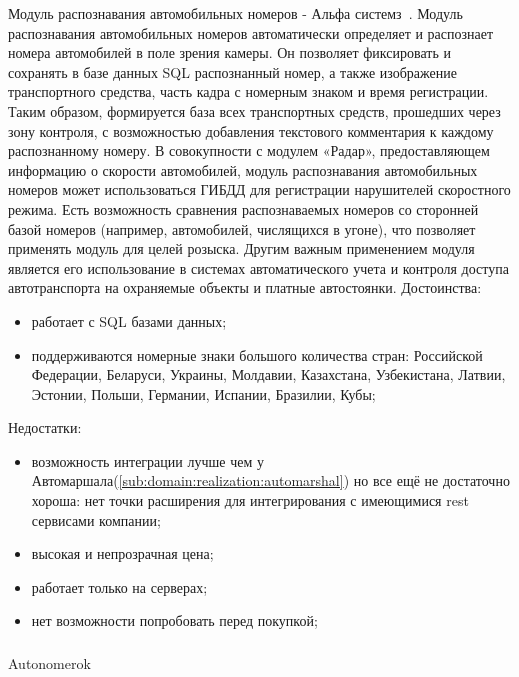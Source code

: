 Модуль распознавания автомобильных номеров - Альфа системз~\cite{alpha_system}. Модуль распознавания автомобильных номеров автоматически определяет и распознает номера автомобилей в поле зрения камеры. Он позволяет фиксировать и сохранять в базе данных SQL распознанный номер, а также изображение транспортного средства, часть кадра с номерным знаком и время регистрации. Таким образом, формируется база всех транспортных средств, прошедших через зону контроля, с возможностью добавления текстового комментария к каждому распознанному номеру. В совокупности с модулем «Радар», предоставляющем информацию о скорости автомобилей, модуль распознавания автомобильных номеров может использоваться ГИБДД для регистрации нарушителей скоростного режима. Есть возможность сравнения распознаваемых номеров со сторонней базой номеров (например, автомобилей, числящихся в угоне), что позволяет применять модуль для целей розыска. Другим важным применением модуля является его использование в системах автоматического учета и контроля доступа автотранспорта на охраняемые объекты и платные автостоянки.
Достоинства:
\begin{itemize}
  \item работает с SQL базами данных;
  \item поддерживаются номерные знаки большого количества стран: Российской Федерации, Беларуси, Украины, Молдавии, Казахстана, Узбекистана, Латвии, Эстонии, Польши, Германии, Испании, Бразилии, Кубы;
\end{itemize}
Недостатки:
\begin{itemize}
  \item возможность интеграции лучше чем у Автомаршала(\ref{sub:domain:realization:automarshal}) но все ещё не достаточно хороша: нет точки расширения для интегрирования с имеющимися rest сервисами компании;
  \item высокая и непрозрачная цена;
  \item работает только на \windows{} серверах;
  \item нет возможности попробовать перед покупкой;
\end{itemize}

\subsubsection{}
Autonomerok

